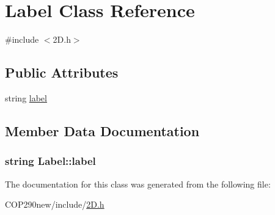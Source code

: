 \hypertarget{class_label}{}\section{Label Class Reference}
\label{class_label}


{\ttfamily \#include $<$2\+D.\+h$>$}

\subsection*{Public Attributes}
\begin{DoxyCompactItemize}
\item 
string \hyperlink{class_label_a8521f1088bbc065c997a428afed1ed3e}{label}
\end{DoxyCompactItemize}


\subsection{Member Data Documentation}
\subsubsection[{\texorpdfstring{label}{label}}]{\setlength{\rightskip}{0pt plus 5cm}string Label\+::label}\hypertarget{class_label_a8521f1088bbc065c997a428afed1ed3e}{}\label{class_label_a8521f1088bbc065c997a428afed1ed3e}


The documentation for this class was generated from the following file\+:\begin{DoxyCompactItemize}
\item 
C\+O\+P290new/include/\hyperlink{2_d_8h}{2\+D.\+h}\end{DoxyCompactItemize}
